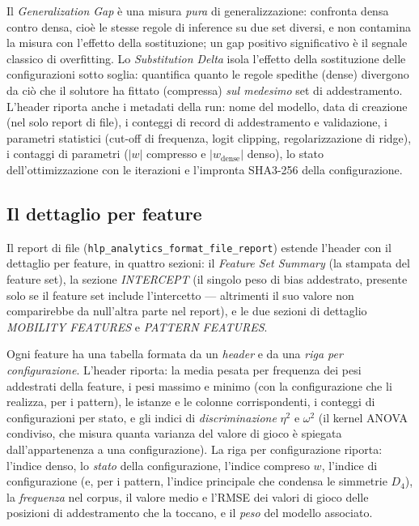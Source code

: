 Il \emph{Generalization Gap} è una misura \emph{pura} di generalizzazione:
confronta densa contro densa, cioè le stesse regole di inference su due set
diversi, e non contamina la misura con l'effetto della sostituzione; un
gap positivo significativo è il segnale classico di overfitting. Lo
\emph{Substitution Delta} isola l'effetto della sostituzione delle
configurazioni sotto soglia: quantifica quanto le regole spedithe
(dense) divergono da ciò che il solutore ha fittato (compressa) \emph{sul
medesimo} set di addestramento. L'header riporta anche i metadati della
run: nome del modello, data di creazione (nel solo report di file), i
conteggi di record di addestramento e validazione, i parametri statistici
(cut-off di frequenza, logit clipping, regolarizzazione di ridge), i
contaggi di parametri ($|w|$ compresso e $|w_{\mathrm{dense}}|$ denso), lo
stato dell'ottimizzazione con le iterazioni e l'impronta SHA3-256 della
configurazione.

\subsection{Il dettaglio per feature}

Il report di file (\texttt{hlp\_analytics\_format\_file\_report}) estende
l'header con il dettaglio per feature, in quattro sezioni: il \emph{Feature
Set Summary} (la stampata del feature set), la sezione \emph{INTERCEPT}
(il singolo peso di bias addestrato, presente solo se il feature set
include l'intercetto — altrimenti il suo valore non comparirebbe da
null'altra parte nel report), e le due sezioni di dettaglio
\emph{MOBILITY FEATURES} e \emph{PATTERN FEATURES}.

Ogni feature ha una tabella formata da un \emph{header} e da una \emph{riga
per configurazione}. L'header riporta: la media pesata per frequenza dei
pesi addestrati della feature, i pesi massimo e minimo (con la
configurazione che li realizza, per i pattern), le istanze e le colonne
corrispondenti, i conteggi di configurazioni per stato, e gli indici di
\emph{discriminazione} $\eta^{2}$ e $\omega^{2}$ (il kernel ANOVA
condiviso, che misura quanta varianza del valore di gioco è spiegata
dall'appartenenza a una configurazione). La riga per configurazione
riporta: l'indice denso, lo \emph{stato} della configurazione, l'indice
compreso $w$, l'indice di configurazione (e, per i pattern, l'indice
principale che condensa le simmetrie $D_4$), la \emph{frequenza} nel corpus,
il valore medio e l'RMSE dei valori di gioco delle posizioni di
addestramento che la toccano, e il \emph{peso} del modello associato.

